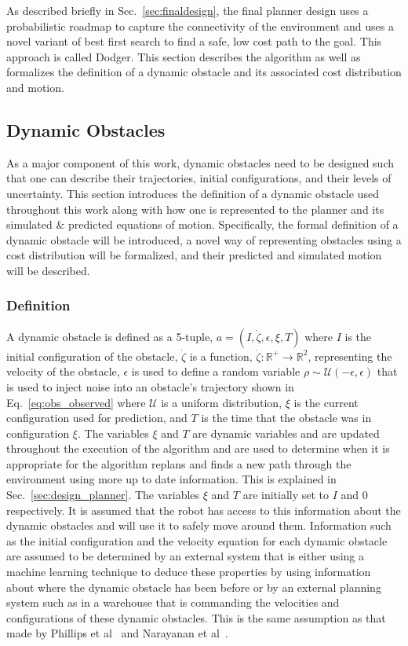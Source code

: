 \documentclass[letterpaper, 10pt, conference]{ieeeconf}
\begin{document}
\label{chapter:methodology}

As described briefly in Sec.~\ref{sec:finaldesign}, the final planner design
uses a probabilistic roadmap to capture the connectivity of the environment and
uses a novel variant of best first search to find a safe, low cost path to the
goal. This approach is called Dodger. This section describes the algorithm as
well as formalizes the definition of a dynamic obstacle and its associated cost
distribution and motion.

\subsection{Dynamic Obstacles}

As a major component of this work, dynamic obstacles need to be designed such
that one can describe their trajectories, initial configurations, and their
levels of uncertainty. This section introduces the definition of a dynamic
obstacle used throughout this work along with how one is represented to the
planner and its simulated \& predicted equations of motion. Specifically, the
formal definition of a dynamic obstacle will be introduced, a novel way of
representing obstacles using a cost distribution will be formalized, and their
predicted and simulated motion will be described.

\subsubsection{Definition}

\label{sec:def}

A dynamic obstacle is defined as a 5-tuple, $a = (I, \dot{\zeta},
\epsilon, \xi, T)$ where $I$ is the initial configuration of the obstacle,
$\dot{\zeta}$ is a function, $\dot{\zeta}: \mathbb{R}^+ \rightarrow
\mathbb{R}^2$, representing the velocity of the obstacle, $\epsilon$ is used to
define a random variable $\rho \sim \mathcal{U}(-\epsilon, \epsilon)$ that is
used to inject noise into an obstacle's trajectory shown in
Eq.~\ref{eq:obs_observed} where $\mathcal{U}$ is a uniform distribution, $\xi$
is the current configuration used for prediction, and $T$ is the time that the
obstacle was in configuration $\xi$.  The variables $\xi$ and $T$ are dynamic
variables and are updated throughout the execution of the algorithm and are
used to determine when it is appropriate for the algorithm replans and finds a
new path through the environment using more up to date information. This is
explained in Sec.~\ref{sec:design_planner}. The variables $\xi$ and $T$ are
initially set to $I$ and $0$ respectively. It is assumed that the robot has
access to this information about the dynamic obstacles and will use it to
safely move around them. Information such as the initial configuration and the
velocity equation for each dynamic obstacle are assumed to be determined by an
external system that is either using a machine learning technique to deduce
these properties by using information about where the dynamic obstacle has been
before or by an external planning system such as in a warehouse that is
commanding the velocities and configurations of these dynamic obstacles. This
is the same assumption as that made by Phillips et al~\cite{sipp} and Narayanan
et al~\cite{asipp}.
\end{document}
